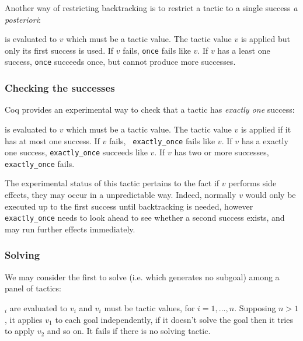 Another way of restricting backtracking is to restrict a tactic to a
single success \emph{a posteriori}:
\begin{quote}
{}
\end{quote}
{\tacexpr} is evaluated to $v$ which must be a tactic value.
The tactic value $v$ is
applied but only its first success is used. If $v$ fails, {\tt once}
{\tacexpr} fails like $v$. If $v$ has a least one success, {\tt once}
{\tacexpr} succeeds once, but cannot produce more successes.

\subsubsection[Checking the successes]{Checking the successes}

Coq provides an experimental way to check that a tactic has \emph{exactly one} success:
\begin{quote}
{}
\end{quote}
{\tacexpr} is evaluated to $v$ which must be a tactic value.
The tactic value $v$ is
applied if it has at most one success. If $v$ fails, {\tt
  exactly\_once} {\tacexpr} fails like $v$. If $v$ has a exactly one
success, {\tt exactly\_once} {\tacexpr} succeeds like $v$. If $v$ has
two or more successes, {\tt exactly\_once} {\tacexpr} fails.

The experimental status of this tactic pertains to the fact if $v$ performs side effects, they may occur in a unpredictable way. Indeed, normally $v$ would only be executed up to the first success until backtracking is needed, however {\tt exactly\_once} needs to look ahead to see whether a second success exists, and may run further effects immediately.

\ErrMsg {}

\subsubsection[Solving]{Solving
}

We may consider the first to solve (i.e. which generates no subgoal) among a
panel of tactics:
\begin{quote}
{}
\end{quote}
{\tacexpr}$_i$ are evaluated to $v_i$ and $v_i$ must be tactic values,
for $i=1,...,n$. Supposing $n>1$, it applies $v_1$ to each goal
independently, if it doesn't solve the goal then it tries to apply
$v_2$ and so on. It fails if there is no solving tactic.

